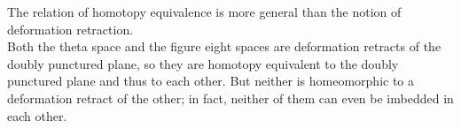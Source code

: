 \begin{remark}
The relation of homotopy equivalence is more general than the notion of deformation retraction. \\

Both the theta space and the figure eight spaces are deformation retracts of the doubly punctured plane, so they are homotopy equivalent to the doubly punctured plane and thus to each other. But neither is homeomorphic to a deformation retract of the other; in fact, neither of them can even be imbedded in each other. 
\end{remark}